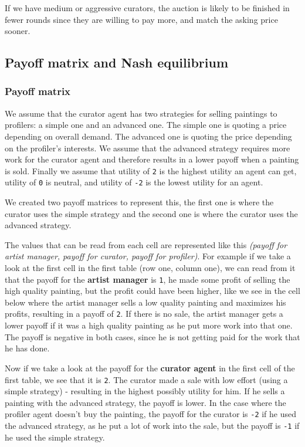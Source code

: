\documentclass[a4paper, 11pt]{article}
\begin{document}
If we have medium or aggressive curators, the auction is likely to be finished in fewer rounds since they are willing to pay more, and match the asking price sooner.

\subsection{Payoff matrix and Nash equilibrium}

\subsubsection{Payoff matrix}

We assume that the curator agent has two strategies for selling paintings to profilers: a simple one and an advanced one. The simple one is quoting a price depending on overall demand. The advanced one is quoting the price depending on the profiler's interests. We assume that the advanced strategy requires more work for the curator agent and therefore results in a lower payoff when a painting is sold. Finally we assume that utility of \texttt{2} is the highest utility an agent can get, utility of \texttt{0} is neutral, and utility of \texttt{-2} is the lowest utility for an agent.

We created two payoff matrices to represent this, the first one is where the curator uses the simple strategy and the second one is where the curator uses the advanced strategy.

The values that can be read from each cell are represented like this \textit{(payoff for artist manager, payoff for curator, payoff for profiler)}. For example if we take a look at the first cell in the first table (row one, column one), we can read from it that the payoff for the \textbf{artist manager} is \texttt{1}, he made some profit of selling the high quality painting, but the profit could have been higher, like we see in the cell below where the artist manager sells a low quality painting and maximizes his profits, resulting in a payoff of \texttt{2}. If there is no sale, the artist manager gets a lower payoff if it was a high quality painting as he put more work into that one. The payoff is negative in both cases, since he is not getting paid for the work that he has done.

Now if we take a look at the payoff for the \textbf{curator agent} in the first cell of the first table, we see that it is \texttt{2}. The curator made a sale with low effort (using a simple strategy) - resulting in the highest possibly utility for him. If he sells a painting with the advanced strategy, the payoff is lower. In the case where the profiler agent doesn't buy the painting, the payoff for the curator is \texttt{-2} if he used the advanced strategy, as he put a lot of work into the sale, but the payoff is \texttt{-1} if he used the simple strategy.
\end{document}
